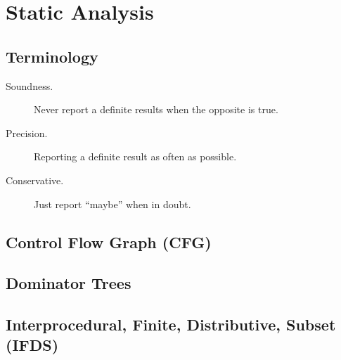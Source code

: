 \chapter{Static Analysis}

\section{Terminology}

\begin{description}
  \item[Soundness.] Never report a definite results when the opposite is true.
  \item[Precision.] Reporting a definite result as often as possible.
  \item[Conservative.] Just report ``maybe'' when in doubt.
\end{description}

\section{Control Flow Graph (CFG)}


\section{Dominator Trees}


\section{Interprocedural, Finite, Distributive, Subset (IFDS)}
